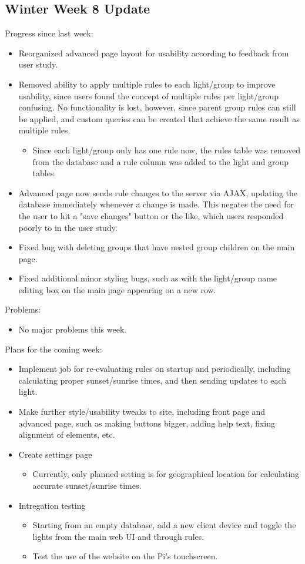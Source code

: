 \subsection{Winter Week 8 Update}
Progress since last week:
\begin{itemize}
   \item Reorganized advanced page layout for usability according to feedback from user study.
   \item Removed ability to apply multiple rules to each light/group to improve usability, since users found the concept of multiple rules per light/group confusing.  No functionality is lost, however, since parent group rules can still be applied, and custom queries can be created that achieve the same result as multiple rules.
      \begin{itemize}
         \item Since each light/group only has one rule now, the rules table was removed from the database and a rule column was added to the light and group tables.
      \end{itemize}
   \item Advanced page now sends rule changes to the server via AJAX, updating the database immediately whenever a change is made.  This negates the need for the user to hit a "save changes" button or the like, which users responded poorly to in the user study.
   \item Fixed bug with deleting groups that have nested group children on the main page.
   \item Fixed additional minor styling bugs, such as with the light/group name editing box on the main page appearing on a new row.
\end{itemize}
Problems:
\begin{itemize}
   \item No major problems this week.
\end{itemize}
Plans for the coming week:
\begin{itemize}
   \item Implement job for re-evaluating rules on startup and periodically, including calculating proper sunset/sunrise times, and then sending updates to each light.
   \item Make further style/usability tweaks to site, including front page and advanced page, such as making buttons bigger, adding help text, fixing alignment of elements, etc.
   \item Create settings page
      \begin{itemize}
         \item Currently, only planned setting is for geographical location for calculating accurate sunset/sunrise times.
      \end{itemize}
   \item Intregation testing
      \begin{itemize}
         \item Starting from an empty database, add a new client device and toggle the lights from the main web UI and through rules.
         \item Test the use of the website on the Pi's touchscreen.
      \end{itemize}
\end{itemize}
